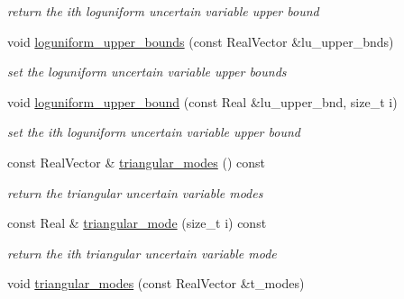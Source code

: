 \begin{DoxyCompactItemize}
\begin{DoxyCompactList}\small\item\em return the ith loguniform uncertain variable upper bound \end{DoxyCompactList}\item 
void \hyperlink{classPecos_1_1AleatoryDistParams_aaaee4a8e6da2963ba869425c0b2a62e7}{loguniform\+\_\+upper\+\_\+bounds} (const Real\+Vector \&lu\+\_\+upper\+\_\+bnds)\label{classPecos_1_1AleatoryDistParams_aaaee4a8e6da2963ba869425c0b2a62e7}

\begin{DoxyCompactList}\small\item\em set the loguniform uncertain variable upper bounds \end{DoxyCompactList}\item 
void \hyperlink{classPecos_1_1AleatoryDistParams_a92905704aa8058c89a760af11cd465db}{loguniform\+\_\+upper\+\_\+bound} (const Real \&lu\+\_\+upper\+\_\+bnd, size\+\_\+t i)\label{classPecos_1_1AleatoryDistParams_a92905704aa8058c89a760af11cd465db}

\begin{DoxyCompactList}\small\item\em set the ith loguniform uncertain variable upper bound \end{DoxyCompactList}\item 
const Real\+Vector \& \hyperlink{classPecos_1_1AleatoryDistParams_aa8fd0b07cd96431cc556fb7263563484}{triangular\+\_\+modes} () const \label{classPecos_1_1AleatoryDistParams_aa8fd0b07cd96431cc556fb7263563484}

\begin{DoxyCompactList}\small\item\em return the triangular uncertain variable modes \end{DoxyCompactList}\item 
const Real \& \hyperlink{classPecos_1_1AleatoryDistParams_aab4d9f43d32f036a1ee4b3307197f74c}{triangular\+\_\+mode} (size\+\_\+t i) const \label{classPecos_1_1AleatoryDistParams_aab4d9f43d32f036a1ee4b3307197f74c}

\begin{DoxyCompactList}\small\item\em return the ith triangular uncertain variable mode \end{DoxyCompactList}\item 
void \hyperlink{classPecos_1_1AleatoryDistParams_a33c564cef7b638494c155cc4fdb81583}{triangular\+\_\+modes} (const Real\+Vector \&t\+\_\+modes)\label{classPecos_1_1AleatoryDistParams_a33c564cef7b638494c155cc4fdb81583}


\end{DoxyCompactItemize}
